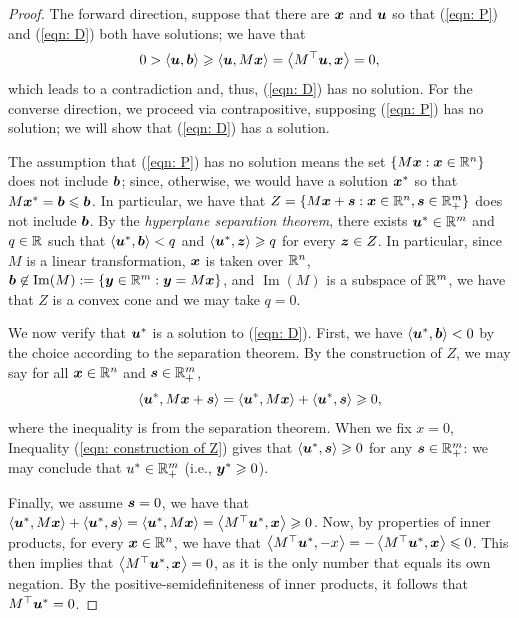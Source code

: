 \begin{proof}
The forward direction, suppose that there are ${\boldsymbol x}$ and ${\boldsymbol u}$ so that (\ref{eqn: P}) and (\ref{eqn: D}) both have solutions; we have that
\[ 0 > \left\langle{\boldsymbol u}, {\boldsymbol b}\right\rangle \geqslant \left\langle{\boldsymbol u}, M{\boldsymbol x}\right\rangle = \left\langle M^\top {\boldsymbol u} , {\boldsymbol x}\right\rangle = 0, \] which leads to a contradiction and, thus, (\ref{eqn: D}) has no solution. For the converse direction, we proceed via contrapositive, supposing (\ref{eqn: P}) has no solution; we will show that (\ref{eqn: D}) has a solution. 

The assumption that (\ref{eqn: P}) has no solution means the set $\{M{\boldsymbol x}: {\boldsymbol x}\in\mathbb R^n\}$ does not include ${\boldsymbol b}$; since, otherwise, we would have a solution ${\boldsymbol x}^\ast$ so that $M{\boldsymbol x}^\ast = {\boldsymbol b} \leqslant {\boldsymbol b}$. In particular, we have that $Z = \{M{\boldsymbol x} + \boldsymbol s:  {\boldsymbol x}\in\mathbb R^n, {\boldsymbol s}\in\mathbb R_+^m\}$ does not include ${\boldsymbol b}$. By the {\em hyperplane separation theorem}, there exists ${\boldsymbol u}^\ast\in\mathbb R^m$ and $q\in\mathbb R$ such that $\left\langle{\boldsymbol u}^\ast, {\boldsymbol b}\right\rangle < q$ and $\left\langle{\boldsymbol u}^\ast, {\boldsymbol z}\right\rangle \geqslant q$ for every ${\boldsymbol z}\in Z$. In particular, since $M$ is a linear transformation, ${\boldsymbol x}$ is taken over $\mathbb R^n$, ${\boldsymbol b}\not\in \operatorname{Im}(M) := \{{\boldsymbol y}\in\mathbb R^m: {\boldsymbol y}= M{\boldsymbol x}\}$, and $\operatorname{Im}(M)$ is a subspace of $\mathbb R^m$, we have that $Z$ is a convex cone and we may take $q=0$. 

We now verify that ${\boldsymbol u}^\ast$ is a solution to (\ref{eqn: D}). First, we have $\left\langle{\boldsymbol u}^\ast, {\boldsymbol b}\right\rangle < 0$ by the choice according to the separation theorem. By the construction of $Z$, we may say for all ${\boldsymbol x}\in\mathbb R^n$ and ${\boldsymbol s}\in\mathbb R_+^m$, 
\begin{equation}\label{eqn: construction of Z}\left\langle{\boldsymbol u}^\ast, M{\boldsymbol x} + \boldsymbol s\right\rangle = \left\langle{\boldsymbol u}^\ast, M{\boldsymbol x}\right\rangle + \left\langle{\boldsymbol u}^\ast, \boldsymbol s\right\rangle \geqslant 0,
\end{equation} 
where the inequality is from the separation theorem. When we fix $x = 0$, Inequality (\ref{eqn: construction of Z}) gives that $\left\langle{\boldsymbol u}^\ast, \boldsymbol s\right\rangle\geqslant 0$ for any $\boldsymbol s\in\mathbb R_+^m$: we may conclude that $u^\ast\in\mathbb R_+^m$ (i.e., ${\boldsymbol y}^\ast\geqslant 0$). 

Finally, we assume ${\boldsymbol s} = 0$, we have that $ \left\langle\boldsymbol u^\ast, M{\boldsymbol x}\right\rangle + \left\langle{\boldsymbol u}^\ast, \boldsymbol s\right\rangle =  \left\langle{\boldsymbol u}^\ast, M{\boldsymbol x}\right\rangle = \left\langle M^\top {\boldsymbol u}^\ast, {\boldsymbol x}\right\rangle \geqslant 0$. Now, by properties of inner products, for every ${\boldsymbol x}\in\mathbb R^n$, we have that $\left\langle M^\top {\boldsymbol u}^\ast, -x\right\rangle = -\left\langle M^\top {\boldsymbol u}^\ast, {\boldsymbol x}\right\rangle\leqslant 0$. This then implies that $\left\langle M^\top {\boldsymbol u}^\ast, {\boldsymbol x}\right\rangle = 0$, as it is the only number that equals its own negation. By the positive-semidefiniteness of inner products, it follows that $M^\top {\boldsymbol u}^\ast = 0$. 
\end{proof}

